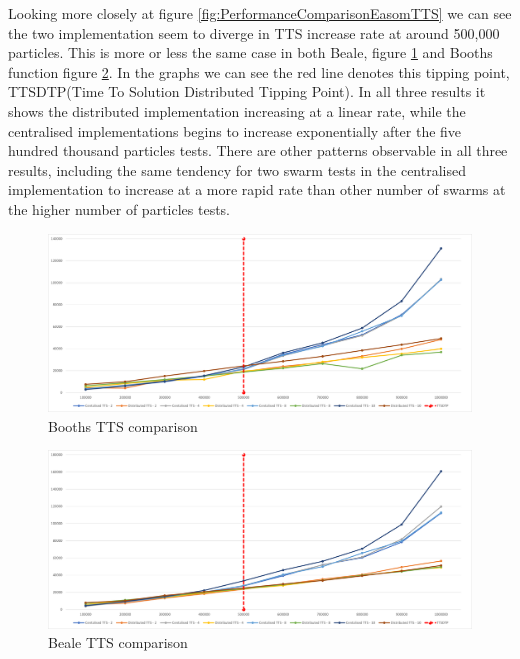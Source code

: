 \documentclass[oneside,12pt]{book}
\begin{document}
Looking more closely at figure \ref{fig:PerformanceComparisonEasomTTS} we can see the two implementation seem to diverge in TTS increase rate at around 500,000 particles. This is more or less the same case in both Beale, figure \ref{fig:PerformanceComparisonBoothsTTS} and Booths function figure \ref{fig:PerformanceComparisonBealeTTS}. In the graphs we can see the red line denotes this tipping point, TTSDTP(Time To Solution Distributed Tipping Point). In all three results it shows the distributed implementation increasing at a linear rate, while the centralised implementations begins to increase exponentially after the five hundred thousand particles tests. There are other patterns observable in all three results, including the same tendency for two swarm tests in the centralised implementation to increase at a more rapid rate than other number of swarms at the higher number of particles tests. 

\begin{figure}[H]
    \centering
    \includegraphics[scale=0.45]{Images/Graphs/PerformanceComparisonBoothsTTS.png}
    \caption{Booths TTS comparison}
    \label{fig:PerformanceComparisonBoothsTTS}
\end{figure}

\begin{figure}[H]
    \centering
    \includegraphics[scale=0.45]{Images/Graphs/PerformanceComparisonBealeTTS.png}
    \caption{Beale TTS comparison}
    \label{fig:PerformanceComparisonBealeTTS}
\end{figure}
\end{document}
